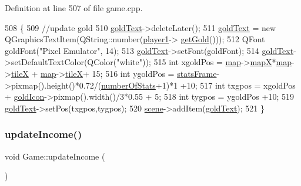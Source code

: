 Definition at line 507 of file game.\+cpp.


\begin{DoxyCode}
508 \{
509     \textcolor{comment}{//update gold}
510     \hyperlink{class_game_a744c42428dc6293af83752027f9cbfde}{goldText}->deleteLater();
511     \hyperlink{class_game_a744c42428dc6293af83752027f9cbfde}{goldText} = \textcolor{keyword}{new} QGraphicsTextItem(QString::number(\hyperlink{class_game_ad8a7cc146f99c7ec5b7c3c25d73f118c}{player1}->
      \hyperlink{class_player1_a9395a16fecb7b96395455f096ac1b60b}{getGold}()));
512     QFont goldFont(\textcolor{stringliteral}{"Pixel Emulator"}, 14);
513     \hyperlink{class_game_a744c42428dc6293af83752027f9cbfde}{goldText}->setFont(goldFont);
514     \hyperlink{class_game_a744c42428dc6293af83752027f9cbfde}{goldText}->setDefaultTextColor(QColor(\textcolor{stringliteral}{"white"}));
515     \textcolor{keywordtype}{int} xgoldPos = \hyperlink{class_game_acef3a39fdf14be2c980b0dc11e7be402}{map}->\hyperlink{class_map_acfd20721da29a2e353598555e23e12f0}{mapX}*\hyperlink{class_game_acef3a39fdf14be2c980b0dc11e7be402}{map}->\hyperlink{class_map_af2aa425dd22aba483ae973c4a15fe934}{tileX} + \hyperlink{class_game_acef3a39fdf14be2c980b0dc11e7be402}{map}->\hyperlink{class_map_af2aa425dd22aba483ae973c4a15fe934}{tileX}+ 15;
516     \textcolor{keywordtype}{int} ygoldPos = \hyperlink{class_game_a3b40718d348c0f12af63a3f428924ab4}{statsFrame}->pixmap().height()*0.72/(\hyperlink{class_game_af041d097dc2350360c7951e5a41bc48a}{numberOfStats}+1)*1 +10;
517     \textcolor{keywordtype}{int} txgpos = xgoldPos + \hyperlink{class_game_a1ac5cae6ba58ec5fe157b138d6c41eac}{goldIcon}->pixmap().width()/3*0.55 + 5;
518     \textcolor{keywordtype}{int} tygpos = ygoldPos +10;
519     \hyperlink{class_game_a744c42428dc6293af83752027f9cbfde}{goldText}->setPos(txgpos,tygpos);
520     \hyperlink{class_game_a8119e3b9a632906c6808fa294b46a92a}{scene}->addItem(\hyperlink{class_game_a744c42428dc6293af83752027f9cbfde}{goldText});
521 \}
\end{DoxyCode}
\mbox{\label{class_game_a5a6924497d779286af09f339d4c7a598}} 
\subsubsection{\texorpdfstring{update\+Income()}{updateIncome()}}
{\footnotesize\ttfamily void Game\+::update\+Income (\begin{DoxyParamCaption}{ }\end{DoxyParamCaption})}



